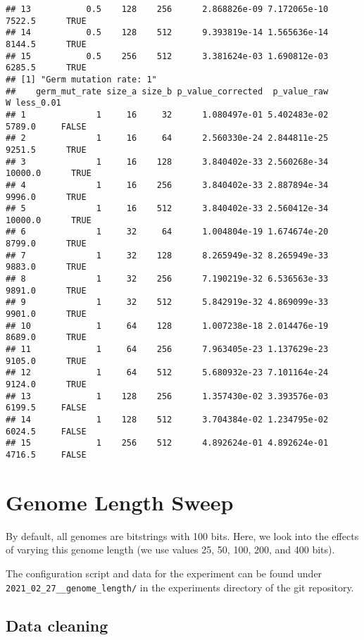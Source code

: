 \documentclass[]{book}
\begin{document}
\begin{verbatim}
## 13           0.5    128    256      2.868826e-09 7.172065e-10  7522.5      TRUE
## 14           0.5    128    512      9.393819e-14 1.565636e-14  8144.5      TRUE
## 15           0.5    256    512      3.381624e-03 1.690812e-03  6285.5      TRUE
## [1] "Germ mutation rate: 1"
##    germ_mut_rate size_a size_b p_value_corrected  p_value_raw       W less_0.01
## 1              1     16     32      1.080497e-01 5.402483e-02  5789.0     FALSE
## 2              1     16     64      2.560330e-24 2.844811e-25  9251.5      TRUE
## 3              1     16    128      3.840402e-33 2.560268e-34 10000.0      TRUE
## 4              1     16    256      3.840402e-33 2.887894e-34  9996.0      TRUE
## 5              1     16    512      3.840402e-33 2.560412e-34 10000.0      TRUE
## 6              1     32     64      1.004804e-19 1.674674e-20  8799.0      TRUE
## 7              1     32    128      8.265949e-32 8.265949e-33  9883.0      TRUE
## 8              1     32    256      7.190219e-32 6.536563e-33  9891.0      TRUE
## 9              1     32    512      5.842919e-32 4.869099e-33  9901.0      TRUE
## 10             1     64    128      1.007238e-18 2.014476e-19  8689.0      TRUE
## 11             1     64    256      7.963405e-23 1.137629e-23  9105.0      TRUE
## 12             1     64    512      5.680932e-23 7.101164e-24  9124.0      TRUE
## 13             1    128    256      1.357430e-02 3.393576e-03  6199.5     FALSE
## 14             1    128    512      3.704384e-02 1.234795e-02  6024.5     FALSE
## 15             1    256    512      4.892624e-01 4.892624e-01  4716.5     FALSE
\end{verbatim}

\hypertarget{genome-length-sweep}{%
\chapter{Genome Length Sweep}\label{genome-length-sweep}}

By default, all genomes are bitstrings with 100 bits.
Here, we look into the effects of varying this genome length (we use values 25, 50, 100, 200, and 400 bits).

The configuration script and data for the experiment can be found under \texttt{2021\_02\_27\_\_genome\_length/} in the experiments directory of the git repository.

\hypertarget{data-cleaning-1}{%
\section{Data cleaning}\label{data-cleaning-1}}
\end{document}
